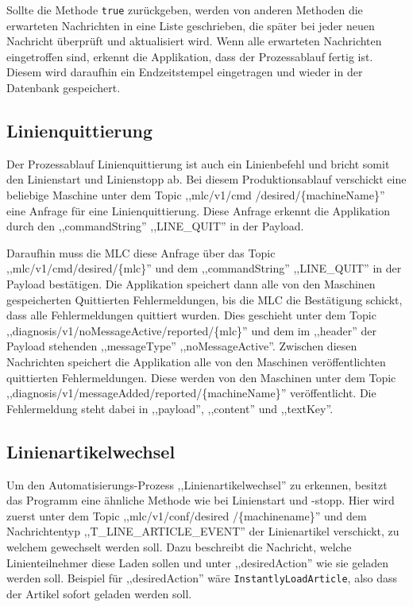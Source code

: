 Sollte die Methode \texttt{true} zurückgeben, werden von anderen Methoden die erwarteten Nachrichten in eine Liste geschrieben, die später bei jeder neuen Nachricht überprüft und aktualisiert wird. Wenn alle erwarteten Nachrichten eingetroffen sind, erkennt die Applikation, dass der Prozessablauf fertig ist. Diesem wird daraufhin ein Endzeitstempel eingetragen und wieder in der Datenbank gespeichert.
\subsection{Linienquittierung}
Der Prozessablauf Linienquittierung ist auch ein Linienbefehl und bricht somit den Linienstart und Linienstopp ab. Bei diesem Produktionsablauf verschickt eine beliebige Maschine unter dem Topic ,,mlc/v1/cmd /desired/\{machineName\}'' eine Anfrage für eine Linienquittierung. Diese Anfrage erkennt die Applikation durch den ,,commandString'' ,,LINE\_QUIT'' in der Payload.

Daraufhin muss die MLC diese Anfrage über das Topic ,,mlc/v1/cmd/desired/\{mlc\}'' und dem ,,commandString'' ,,LINE\_QUIT'' in der Payload bestätigen. Die Applikation speichert dann alle von den Maschinen gespeicherten Quittierten Fehlermeldungen, bis die MLC die Bestätigung schickt, dass alle Fehlermeldungen quittiert wurden. Dies geschieht unter dem Topic ,,diagnosis/v1/noMessageActive/reported/\{mlc\}'' und dem im ,,header'' der Payload stehenden ,,messageType'' ,,noMessageActive''. Zwischen diesen Nachrichten speichert die Applikation alle von den Maschinen veröffentlichten quittierten Fehlermeldungen. Diese werden von den Maschinen unter dem Topic ,,diagnosis/v1/messageAdded/reported/\{machineName\}'' veröffentlicht. Die Fehlermeldung steht dabei in ,,payload'', ,,content'' und ,,textKey''.
\subsection{Linienartikelwechsel}
Um den Automatisierungs-Prozess ,,Linienartikelwechsel'' zu erkennen, besitzt das Programm eine ähnliche Methode wie bei Linienstart und -stopp. Hier wird zuerst unter dem Topic ,,mlc/v1/conf/desired /\{machinename\}'' und dem Nachrichtentyp ,,T\_LINE\_ARTICLE\_EVENT'' der Linienartikel verschickt, zu welchem gewechselt werden soll. Dazu beschreibt die Nachricht, welche Linienteilnehmer diese Laden sollen und unter ,,desiredAction'' wie sie geladen werden soll. Beispiel für ,,desiredAction'' wäre \texttt{InstantlyLoadArticle}, also dass der Artikel sofort geladen werden soll.

